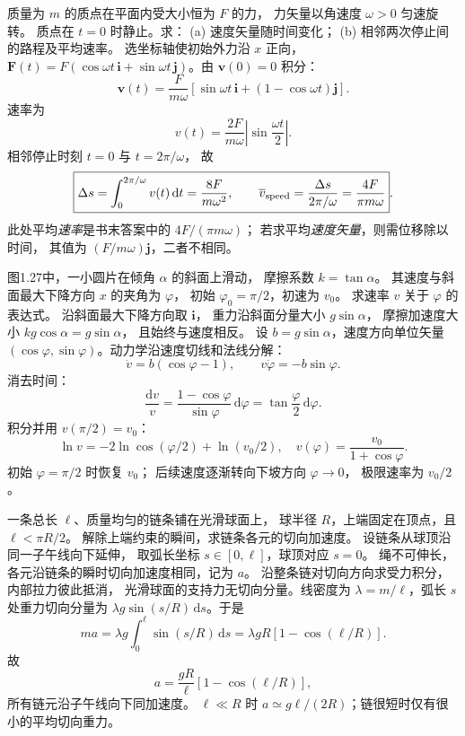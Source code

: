 质量为 $m$ 的质点在平面内受大小恒为 $F$ 的力，
力矢量以角速度 $\omega>0$ 匀速旋转。
质点在 $t=0$ 时静止。求：
(a) 速度矢量随时间变化；
(b) 相邻两次停止间的路程及平均速率。
\exsolution
选坐标轴使初始外力沿 $x$ 正向，
$\bm F(t)=F(\cos\omega t\,\bm i+
\sin\omega t\,\bm j)$。由 $\bm v(0)=0$ 积分：
\[
\boxed{\bm v(t)=\frac{F}{m\omega}
[\sin\omega t\,\bm i+(1-\cos\omega t)\bm j]}.
\]
速率为
\[
v(t)=\frac{2F}{m\omega}
\left|\sin\frac{\omega t}{2}\right|.
\]
相邻停止时刻 $t=0$ 与 $t=2\pi/\omega$，
故
\[
\boxed{\Delta s=\int_0^{2\pi/\omega}v(t)\,\mathrm dt
=\frac{8F}{m\omega^2},\qquad
\overline{v}_{\rm speed}=\frac{\Delta s}{2\pi/\omega}
=\frac{4F}{\pi m\omega}}.
\]
\excheck 此处平均\emph{速率}是书末答案中的 $4F/(\pi m\omega)$；
若求平均\emph{速度矢量}，则需位移除以时间，
其值为 $(F/m\omega)\bm j$，二者不相同。

图1.27中，一小圆片在倾角 $\alpha$ 的斜面上滑动，
摩擦系数 $k=\tan\alpha$。
其速度与斜面最大下降方向 $x$ 的夹角为 $\varphi$，
初始 $\varphi_0=\pi/2$，初速为 $v_0$。
求速率 $v$ 关于 $\varphi$ 的表达式。
\exsolution
沿斜面最大下降方向取 $\bm i$，
重力沿斜面分量大小 $g\sin\alpha$，
摩擦加速度大小 $kg\cos\alpha=g\sin\alpha$，
且始终与速度相反。
设 $b=g\sin\alpha$，速度方向单位矢量
$(\cos\varphi,\sin\varphi)$。动力学沿速度切线和法线分解：
\[
\dot v=b(\cos\varphi-1),\qquad
v\dot\varphi=-b\sin\varphi.
\]
消去时间：
\[
\frac{\mathrm dv}{v}
=\frac{1-\cos\varphi}{\sin\varphi}\,\mathrm d\varphi
=\tan\frac\varphi2\,\mathrm d\varphi.
\]
积分并用 $v(\pi/2)=v_0$：
\[
\ln v=-2\ln\cos(\varphi/2)+\ln(v_0/2),
\quad
\boxed{v(\varphi)=\frac{v_0}{1+\cos\varphi}}.
\]
\excheck 初始 $\varphi=\pi/2$ 时恢复 $v_0$；
后续速度逐渐转向下坡方向 $\varphi\to0$，
极限速率为 $v_0/2$。

一条总长 $\ell$、质量均匀的链条铺在光滑球面上，
球半径 $R$，上端固定在顶点，且 $\ell<\pi R/2$。
解除上端约束的瞬间，求链条各元的切向加速度。
\exsolution
设链条从球顶沿同一子午线向下延伸，
取弧长坐标 $s\in[0,\ell]$，球顶对应 $s=0$。
绳不可伸长，各元沿链条的瞬时切向加速度相同，记为 $a$。
沿整条链对切向方向求受力积分，内部拉力彼此抵消，
光滑球面的支持力无切向分量。线密度为
$\lambda=m/\ell$，弧长 $s$ 处重力切向分量为
$\lambda g\sin(s/R)\,\mathrm ds$。于是
\[
ma=\lambda g\int_0^\ell\sin(s/R)\,\mathrm ds
=\lambda gR[1-\cos(\ell/R)].
\]
故
\[
\boxed{a=\frac{gR}{\ell}[1-\cos(\ell/R)]},
\]
所有链元沿子午线向下同加速度。
\excheck $\ell\ll R$ 时
$a\simeq g\ell/(2R)$；链很短时仅有很小的平均切向重力。

